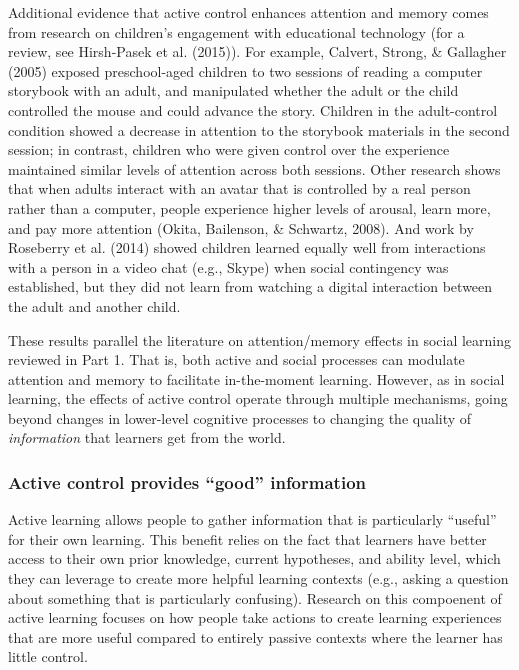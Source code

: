 \documentclass[a4paper,man,apacite,floatsintext]{apa6}
\begin{document}
Additional evidence that active control enhances attention and memory
comes from research on children's engagement with educational technology
(for a review, see Hirsh-Pasek et al. (2015)). For example, Calvert,
Strong, \& Gallagher (2005) exposed preschool-aged children to two
sessions of reading a computer storybook with an adult, and manipulated
whether the adult or the child controlled the mouse and could advance
the story. Children in the adult-control condition showed a decrease in
attention to the storybook materials in the second session; in contrast,
children who were given control over the experience maintained similar
levels of attention across both sessions. Other research shows that when
adults interact with an avatar that is controlled by a real person
rather than a computer, people experience higher levels of arousal,
learn more, and pay more attention (Okita, Bailenson, \& Schwartz,
2008). And work by Roseberry et al. (2014) showed children learned
equally well from interactions with a person in a video chat (e.g.,
Skype) when social contingency was established, but they did not learn
from watching a digital interaction between the adult and another child.

These results parallel the literature on attention/memory effects in
social learning reviewed in Part 1. That is, both active and social
processes can modulate attention and memory to facilitate in-the-moment
learning. However, as in social learning, the effects of active control
operate through multiple mechanisms, going beyond changes in lower-level
cognitive processes to changing the quality of \emph{information} that
learners get from the world.

\subsubsection{\texorpdfstring{Active control provides ``good''
information}{Active control provides good information}}\label{active-control-provides-good-information}

Active learning allows people to gather information that is particularly
``useful'' for their own learning. This benefit relies on the fact that
learners have better access to their own prior knowledge, current
hypotheses, and ability level, which they can leverage to create more
helpful learning contexts (e.g., asking a question about something that
is particularly confusing). Research on this compoenent of active
learning focuses on how people take actions to create learning
experiences that are more useful compared to entirely passive contexts
where the learner has little control.
\end{document}
